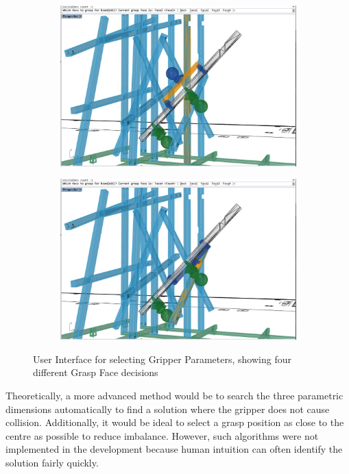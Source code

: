 \begin{figure}[!h]
\begin{subfigure}[b]{0.49\textwidth}
        \includegraphics[width=\textwidth]{images/6a/img28.jpg}
    \end{subfigure}
    \hfill
    \begin{subfigure}[b]{0.49\textwidth}
        \centering
        \includegraphics[width=\textwidth]{images/6a/img29.jpg}
    \end{subfigure}
    \caption{User Interface for selecting Gripper Parameters, showing four different Grasp Face decisions}
    \label{fig:ui-for-selecting-gripper-parameters}
\end{figure}

Theoretically, a more advanced method would be to search the three parametric dimensions automatically to find a solution where the gripper does not cause collision. Additionally, it would be ideal to select a grasp position as close to the centre as possible to reduce imbalance. However, such algorithms were not implemented in the development because human intuition can often identify the solution fairly quickly. 

